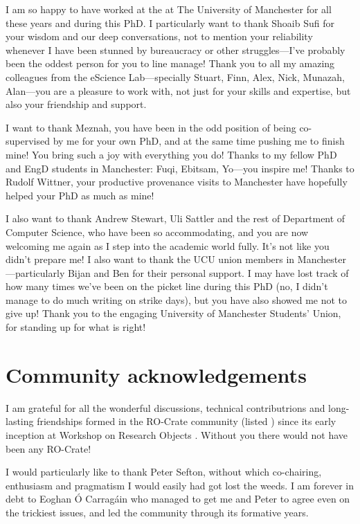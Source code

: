 I am so happy to have worked at the  at The University of Manchester for all these years and during this PhD. I particularly want to thank Shoaib Sufi for your wisdom and our deep conversations, not to mention your reliability whenever I have been stunned by bureaucracy or other struggles---I've probably been the oddest person for you to line manage! 
Thank you to all my amazing colleagues from the eScience Lab---specially Stuart, Finn, Alex, Nick, Munazah, Alan---you are a pleasure to work with, not just for your skills and expertise, but also your friendship and support.

I want to thank Meznah, you have been in the odd position of being co-supervised by me for your own PhD, and at the same time pushing me to finish mine! You bring such a joy with everything you do!  Thanks to my fellow PhD and EngD students in Manchester: Fuqi, Ebitsam, Yo---you inspire me! Thanks to Rudolf Wittner, your productive provenance visits to Manchester have hopefully helped your PhD as much as mine!  

I also want to thank Andrew Stewart, Uli Sattler and the rest of Department of Computer Science, who have been so accommodating, and you are now welcoming me again as I step into the academic world fully. It's not like you didn't prepare me!
I also want to thank the UCU union members in Manchester ---particularly Bijan and Ben for their personal support. I may have lost track of how many times we've been on the picket line during this PhD (no, I didn't manage to do much writing on strike days), but you have also showed me not to give up!  Thank you to the engaging University of Manchester Students' Union, for standing up for what is right!


\section{Community acknowledgements}\label{community-acknowledgements}

I am grateful for all the wonderful discussions, technical contributrions and long-lasting friendships formed in the RO-Crate community (listed ) since its early inception \cite{Ó Carragáin 2019a} at Workshop on Research Objects . Without you there would not have been any RO-Crate!

I would particularly like to thank Peter Sefton, without which co-chairing, enthusiasm and pragmatism I would easily had got lost the weeds.  I am forever in debt to Eoghan Ó Carragáin who managed to get me and Peter to agree even on the trickiest issues, and led the community through its formative years.

